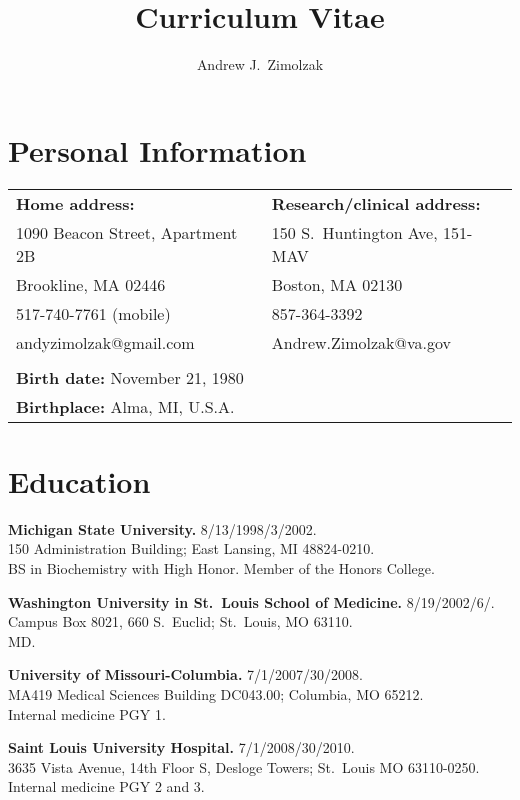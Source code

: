 \documentclass[12pt]{article}
\title{Curriculum Vitae}
\author{Andrew J.\ Zimolzak}
\begin{document}
\thispagestyle{fancy}

\section*{Personal Information}

\begin{tabular}{l l}
\textbf{Home address:}           & \textbf{Research/clinical address:}\\
1090 Beacon Street, Apartment 2B & 150 S.\ Huntington Ave, 151-MAV\\
Brookline, MA 02446              & Boston, MA 02130\\
517-740-7761 (mobile)            & 857-364-3392\\
andyzimolzak@gmail.com           & Andrew.Zimolzak@va.gov\\
\\
\textbf{Birth date:} November 21, 1980\\
\textbf{Birthplace:} Alma, MI, U.S.A.
\end{tabular}

\section*{Education}

\textbf{Michigan State University.} 8/13/1998/3/2002.\\
150 Administration Building; East Lansing, MI 48824-0210.\\
BS in Biochemistry with High Honor. Member of the Honors College.

\textbf{Washington University in St.\ Louis School of Medicine.}
8/19/2002\ndash{}/6/.\\
Campus Box 8021, 660 S.\ Euclid; St.\ Louis, MO 63110.\\
MD.

\textbf{University of Missouri-Columbia.} 7/1/2007/30/2008.\\
MA419 Medical Sciences Building DC043.00; Columbia, MO 65212.\\
Internal medicine PGY 1.

\textbf{Saint Louis University Hospital.} 7/1/2008/30/2010.\\
3635 Vista Avenue, 14th Floor S, Desloge Towers; St.\ Louis MO
63110-0250.\\
Internal medicine PGY 2 and 3.
\end{document}

